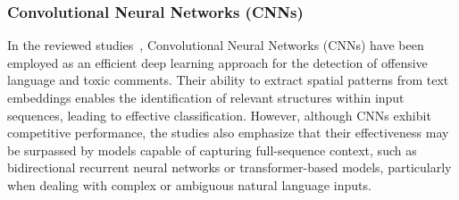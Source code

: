 \subsubsection{Convolutional Neural Networks (CNNs)}
In the reviewed studies~\cite{bonetti2023comparison,fieri2023offensive}, Convolutional Neural Networks (CNNs) have been employed as an efficient deep learning approach for the detection of offensive language and toxic comments. Their ability to extract spatial patterns from text embeddings enables the identification of relevant structures within input sequences, leading to effective classification. However, although CNNs exhibit competitive performance, the studies also emphasize that their effectiveness may be surpassed by models capable of capturing full-sequence context, such as bidirectional recurrent neural networks or transformer-based models, particularly when dealing with complex or ambiguous natural language inputs.
